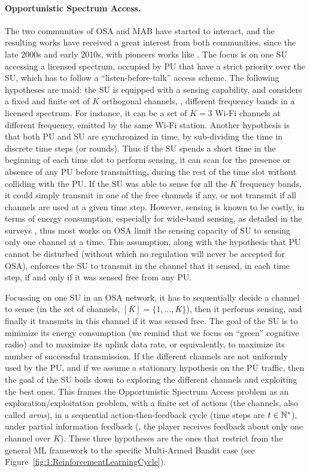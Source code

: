 \paragraph{Opportunistic Spectrum Access.}
%
The two communities of OSA and MAB have started to interact, and the resulting works have received a great interest from both communities, since the late $2000$s and early $2010$s, with pioneers works like \cite{Liu08,Zhao10,Jouini09,Jouini10}.
The focus is on one SU accessing a licensed spectrum, occupied by PU that have a strict priority over the SU, which has to follow a ``listen-before-talk'' access scheme.
%
The following hypotheses are maid:
the SU is equipped with a sensing capability,
and considers a fixed and finite set of $K$ orthogonal channels, \ie, different frequency bands in a licensed spectrum.
For instance, it can be a set of $K=3$ Wi-Fi channels at different frequency, emitted by the same Wi-Fi station.
Another hypothesis is that both PU and SU are synchronized in time, by sub-dividing the time in discrete time steps (or rounds).
%
Thus if the SU spends a short time in the beginning of each time slot to perform sensing, it can scan for the presence or absence of any PU before transmitting, during the rest of the time slot without colliding with the PU.
If the SU was able to sense for all the $K$ frequency bands, it could simply transmit in one of the free channels if any, or not transmit if all channels are used at a given time step.
However, sensing is known to be costly, in terms of energy consumption, especially for wide-band sensing, as detailed in the surveys \cite{yucek2009survey,subhedar2011spectrum}, thus most works on OSA limit the sensing capacity of SU to sensing only one channel at a time.
This assumption, along with the hypothesis that PU cannot be disturbed (without which no regulation will never be accepted for OSA), enforces the SU to transmit in the channel that it sensed, in each time step, if and only if it was sensed free from any PU.

Focussing on one SU in an OSA network, it has to sequentially decide a channel to sense (in the set of channels, $[K]=\{1,\dots,K\}$), then it performs sensing, and finally it transmits in this channel if it was sensed free.
The goal of the SU is to minimize its energy consumption (we remind that we focus on ``green'' cognitive radio) and to maximize its uplink data rate, or equivalently, to maximize its number of successful transmission.
%
If the different channels are not uniformly used by the PU, and if we assume a stationary hypothesis on the PU traffic, then the goal of the SU boils down to exploring the different channels and exploiting the best ones.
This frames the Opportunistic Spectrum Access problem as an exploration/exploitation problem,
with a finite set of actions (the channels, also called \emph{arms}),
in a sequential action-then-feedback cycle (time steps are $t\in\mathbb{N}^*$),
under partial information feedback (\ie, the player receives feedback about only one channel over $K$).
These three hypotheses are the ones that restrict from the general ML framework to the specific Multi-Armed Bandit case (see Figure~\ref{fig:1:ReinforcementLearningCycle}).


